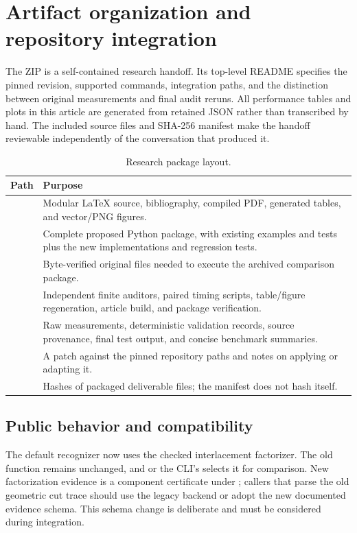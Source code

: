 \section{Artifact organization and repository integration}
\label{sec:artifacts}

The ZIP is a self-contained research handoff.  Its top-level README specifies
the pinned revision, supported commands, integration paths, and the distinction
between original measurements and final audit reruns.  All performance tables
and plots in this article are generated from retained JSON rather than
transcribed by hand.  The included source files and SHA-256 manifest make
the handoff reviewable independently of the conversation that produced it.

\begin{table}[htbp]
\centering\small
\begin{tabular}{P{45mm}P{97mm}}
\toprule
Path & Purpose \\
\midrule
{} & Modular \LaTeX{} source, bibliography, compiled PDF,
generated tables, and vector/PNG figures. \\
 & Complete proposed Python package, with existing examples
and tests plus the new implementations and regression tests. \\
 & Byte-verified original files needed to execute
the archived comparison package. \\
 & Independent finite auditors, paired timing scripts,
table/figure regeneration, article build, and package verification. \\
 & Raw measurements, deterministic validation records,
source provenance, final test output, and concise benchmark summaries. \\
 & A patch against the pinned repository paths and
notes on applying or adapting it. \\
 & Hashes of packaged deliverable files; the manifest
does not hash itself. \\
\bottomrule
\end{tabular}
\caption{Research package layout.}
\end{table}

\subsection{Public behavior and compatibility}

The default recognizer now uses the checked interlacement factorizer.
The old  function remains unchanged, and
 or the CLI's 
selects it for comparison.  New factorization evidence is a component
certificate under ; callers that parse
the old geometric cut trace should use the legacy backend or adopt the
new documented evidence schema.  This schema change is deliberate and
must be considered during integration.

